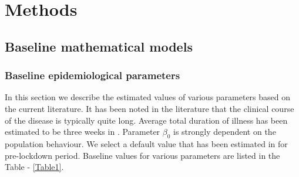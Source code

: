 \documentclass[10pt]{wlscirep}
\begin{document}
\section*{Methods}
\label{SEC4}
\subsection*{Baseline mathematical models}
\subsubsection*{Baseline epidemiological parameters}
In this section we describe the estimated values of various parameters based on the current literature. It has been noted in the literature that the clinical course of the disease is typically quite long. Average total duration of illness has been estimated to be three weeks in \cite{Zhou2020}. Parameter $\beta_0$ is strongly dependent on the population behaviour. We select a default value that has been estimated in \cite{Shen2020.01.23.916726} for pre-lockdown period. Baseline values for various parameters are listed in the Table - \ref{Table1}.
%
%
\end{document}
